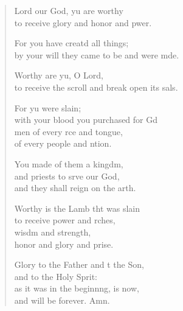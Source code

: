 \begin{verse}
  \begin{patverse}
 Lord our God, yu are worthy\Med\\
to receive glory and honor and pwer.

For you have creatd all things;\Med\\
by your will they came to be and were mde.

Worthy are yu, O Lord,\Med\\
to receive the scroll and break open its sals.

For yu were slain;\Med\\
with your blood you purchased for Gd\\
men of every rce and tongue,\Med\\
of every people and ntion.

You made of them a kingdm,\Flex\\
and priests to srve our God,\Med\\
and they shall reign on the arth.

Worthy is the Lamb tht was slain\Med\\
to receive power and rches,\Med\\
wisdm and strength,\\
honor and glory and prise.

Glory to the Father and t the Son,\Med\\
and to the Holy Sprit:\\
as it was in the beginnng, is now,\Med\\
and will be forever. Amn.
  \end{patverse}
\end{verse}
